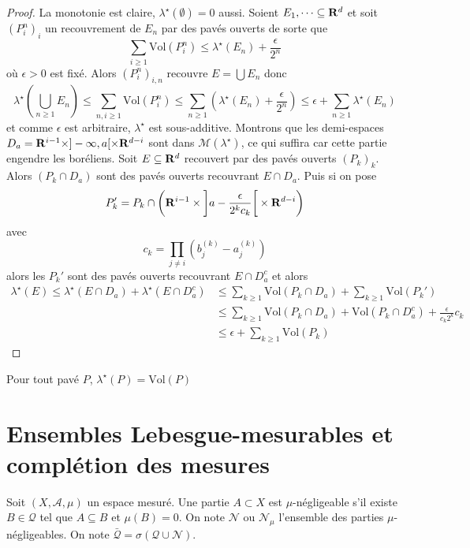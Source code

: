 \begin{proof}
    La monotonie est claire, $\lambda^\star(\emptyset)=0$ aussi. Soient  $E_1, \cdots \subseteq \mathbf R^d$ et soit $(P_i^n)_i$ un recouvrement de $E_n$ par des pavés ouverts de sorte que  \[
        \sum_{i\geq 1}\mathrm{Vol}(P_i^n)\leq \lambda^\star(E_n)+\frac{\epsilon}{2^n}
    \] 
    où $ \epsilon>0$ est fixé. Alors $(P_i^n)_{i,n}$ recouvre $E=\bigcup E_n$ donc \[
        \lambda^\star \left( \bigcup_{n\geq 1}E_n \right) \leq \sum_{n,i\geq 1} \mathrm{Vol}(P_i^n) \leq \sum_{n\geq 1} \left( \lambda^\star(E_n)+ \frac{\epsilon}{2^n} \right)\leq \epsilon + \sum_{n\geq 1}\lambda^\star(E_n)
    \] 
    et comme $\epsilon$ est arbitraire,  $\lambda^\star$ est sous-additive. Montrons que les demi-espaces $D_a=\mathbf R^{i-1}\times ]-\infty, a[\times \mathbf R^{d-i}$ sont dans $\mathcal  M(\lambda^\star)$, ce qui suffira car cette partie engendre les boréliens. Soit $E \subseteq \mathbf R^d$ recouvert par des pavés ouverts $(P_k)_k$. Alors  $(P_k\cap D_a)$ sont des pavés ouverts recouvrant  $E\cap D_a$. Puis si on pose  \[
        P_k'=P_k\cap\left(\mathbf R^{i-1}\times \left]a-\frac{\epsilon}{2^kc_k}\right[\times \mathbf R^{d-i}\right)
    \]
    avec \[c_k=\prod_{j\neq i}(b_j^{(k)}-a_j^{(k)})\] alors les $P_k'$ sont des pavés ouverts recouvrant  $E\cap D_a^c$ et alors  \begin{align*}
    \lambda^\star(E)\leq \lambda^\star(E\cap D_a)+\lambda^\star(E\cap D_a^c)&\leq \sum_{k\geq 1}\mathrm{Vol}(P_k\cap D_a)+\sum_{k\geq 1}\mathrm{Vol}(P_k')\\&\leq \sum_{k\geq 1}\mathrm{Vol}(P_k\cap D_a)+\mathrm{Vol}(P_k\cap D_a^c)+ \frac{\epsilon}{c_k2^k}c_k\\&\leq \epsilon+\sum_{k\geq 1}\mathrm{Vol}(P_k)
\end{align*}
\end{proof}

\begin{prop}
    Pour tout pavé $P$,  $\lambda^\star(P)=\mathrm{Vol}(P)$
\end{prop}

\section{Ensembles Lebesgue-mesurables et complétion des mesures}

\begin{dfn}
    Soit $(X, \mathcal A, \mu)$ un espace mesuré. Une partie  $A\subset X$ est  $\mu$-négligeable s'il existe  $B \in  \mathcal  Q$ tel que $A\subseteq B$ et  $\mu(B)=0$. On note  $\mathcal  N$ ou $\mathcal N_{\mu}$ l'ensemble des parties $\mu$-négligeables. On note  $\bar{\mathcal  Q} =\sigma(\mathcal  Q\cup \mathcal  N)$.
\end{dfn}

